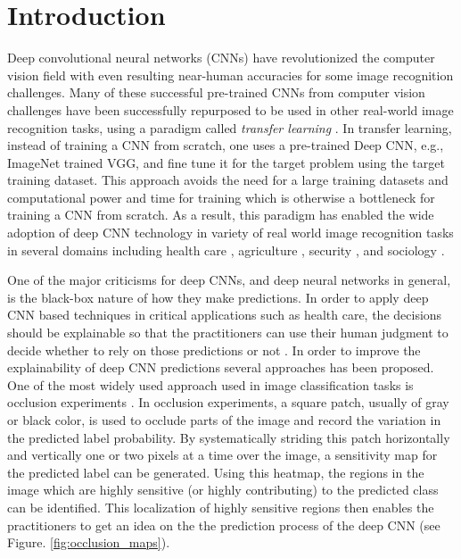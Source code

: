 \section{Introduction}
Deep convolutional neural networks (CNNs) \cite{alexnet, vggnet} have revolutionized the computer vision field with even resulting near-human accuracies for some image recognition challenges.
Many of these successful pre-trained CNNs from computer vision challenges have been successfully repurposed to be used in other real-world image recognition tasks, using a paradigm called \textit{transfer learning} \cite{transfer-learning-factors}.
In transfer learning, instead of training a CNN from scratch, one uses a pre-trained Deep CNN, e.g., ImageNet trained VGG, and fine tune it for the target problem using the target training dataset.
This approach avoids the need for a large training datasets and computational power and time for training which is otherwise a bottleneck for training a CNN from scratch.
As a result, this paradigm has enabled the wide adoption of deep CNN technology in variety of real world image recognition tasks in several domains including health care \cite{kermany2018identifying, islam2017abnormality}, agriculture \cite{mohanty2016using}, security \cite{arbabzadah2016identifying}, and sociology \cite{wang2017deep}.


One of the major criticisms for deep CNNs, and deep neural networks in general, is the black-box nature of how they make predictions.
In order to apply deep CNN based techniques in critical applications such as health care, the decisions should be explainable so that the practitioners can use their human judgment to decide whether to rely on those predictions or not \cite{jung2017deep}.
In order to improve the explainability of deep CNN predictions several approaches has been proposed.
One of the most widely used approach used in image classification tasks is occlusion experiments \cite{zeiler2014visualizing}.
In occlusion experiments, a square patch, usually of gray or black color, is used to occlude parts of the image and record the variation in the predicted label probability.
By systematically striding this patch horizontally and vertically one or two pixels at a time over the image, a sensitivity map for the predicted label can be generated.
Using this heatmap, the regions in the image which are highly sensitive (or highly contributing) to the predicted class can be identified.
This localization of highly sensitive regions then enables the practitioners to get an idea on the the prediction process of the deep CNN (see Figure. \ref{fig:occlusion_maps}).

